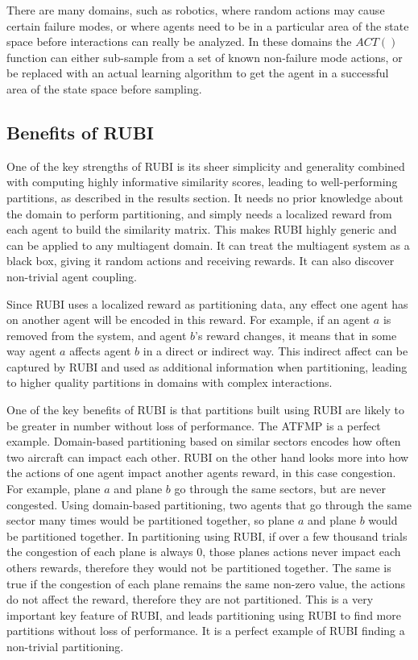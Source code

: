 \documentclass[letterpaper]{article}
\begin{document}
There are many domains, such as robotics, where random actions may cause certain failure modes, or where agents need to be in a particular area of the state space before interactions can really be analyzed. In these domains the $ACT()$ function can either sub-sample from a set of known non-failure mode actions, or be replaced with an actual learning algorithm to get the agent in a successful area of the state space before sampling. 

\vspace{14mm}
\subsection{Benefits of RUBI}
One of the key strengths of RUBI is its sheer simplicity and generality combined with computing highly informative similarity scores, leading to well-performing partitions, as described in the results section. It needs no prior knowledge about the domain to perform partitioning, and simply needs a localized reward from each agent to build the similarity matrix. This makes RUBI highly generic and can be applied to any multiagent domain. It can treat the multiagent system as a black box, giving it random actions and receiving rewards. It can also discover non-trivial agent coupling. 

Since RUBI uses a localized reward as partitioning data, any effect one agent has on another agent will be encoded in this reward. For example, if an agent $a$ is removed from the system, and agent $b$'s reward changes, it means that in some way agent $a$ affects agent $b$ in a direct or indirect way. This indirect affect can be captured by RUBI and used as additional information when partitioning, leading to higher quality partitions in domains with complex interactions.

One of the key benefits of RUBI is that partitions built using RUBI are likely to be greater in number without loss of performance. The ATFMP is a perfect example. Domain-based partitioning based on similar sectors encodes how often two aircraft can impact each other. RUBI on the other hand looks more into how the actions of one agent impact another agents reward, in this case congestion. For example, plane $a$ and plane $b$ go through the same sectors, but are never congested. Using domain-based partitioning, two agents that go through the same sector many times would be partitioned together, so plane $a$ and plane $b$ would be partitioned together. In partitioning using RUBI, if over a few thousand trials the congestion of each plane is always 0, those planes actions never impact each others rewards, therefore they would not be partitioned together. The same is true if the congestion of each plane remains the same non-zero value, the actions do not affect the reward, therefore they are not partitioned. This is a very important key feature of RUBI, and leads partitioning using RUBI to find more partitions without loss of performance. It is a perfect example of RUBI finding a non-trivial partitioning.
\end{document}
